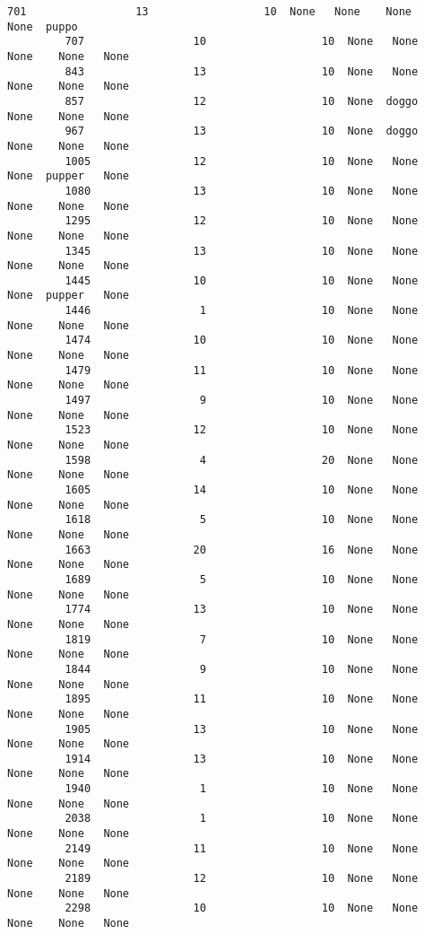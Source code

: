 \documentclass[11pt]{article}
\begin{document}
\begin{Verbatim}[commandchars=\\\{\}]
         701                 13                  10  None   None    None    None  puppo  
         707                 10                  10  None   None    None    None   None  
         843                 13                  10  None   None    None    None   None  
         857                 12                  10  None  doggo    None    None   None  
         967                 13                  10  None  doggo    None    None   None  
         1005                12                  10  None   None    None  pupper   None  
         1080                13                  10  None   None    None    None   None  
         1295                12                  10  None   None    None    None   None  
         1345                13                  10  None   None    None    None   None  
         1445                10                  10  None   None    None  pupper   None  
         1446                 1                  10  None   None    None    None   None  
         1474                10                  10  None   None    None    None   None  
         1479                11                  10  None   None    None    None   None  
         1497                 9                  10  None   None    None    None   None  
         1523                12                  10  None   None    None    None   None  
         1598                 4                  20  None   None    None    None   None  
         1605                14                  10  None   None    None    None   None  
         1618                 5                  10  None   None    None    None   None  
         1663                20                  16  None   None    None    None   None  
         1689                 5                  10  None   None    None    None   None  
         1774                13                  10  None   None    None    None   None  
         1819                 7                  10  None   None    None    None   None  
         1844                 9                  10  None   None    None    None   None  
         1895                11                  10  None   None    None    None   None  
         1905                13                  10  None   None    None    None   None  
         1914                13                  10  None   None    None    None   None  
         1940                 1                  10  None   None    None    None   None  
         2038                 1                  10  None   None    None    None   None  
         2149                11                  10  None   None    None    None   None  
         2189                12                  10  None   None    None    None   None  
         2298                10                  10  None   None    None    None   None  
\end{Verbatim}
            
\end{document}

